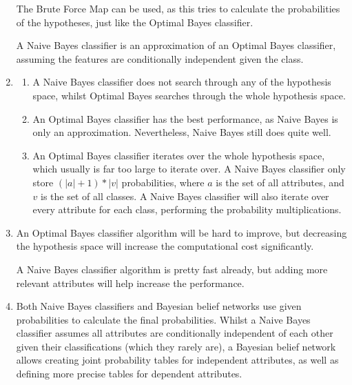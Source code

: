 \documentclass{article}
\begin{document}
\begin{enumerate}
        The Brute Force Map can be used, as this tries to calculate the probabilities of the hypotheses, just like the Optimal Bayes classifier.
        
        A Naive Bayes classifier is an approximation of an Optimal Bayes classifier, assuming the features are conditionally independent given the class.
        
    \item
        \begin{enumerate}[label=(\alph*)]
            \item A Naive Bayes classifier does not search through any of the hypothesis space, whilst Optimal Bayes searches through the whole hypothesis space.
            
            \item An Optimal Bayes classifier has the best performance, as Naive Bayes is only an approximation. Nevertheless, Naive Bayes still does quite well.
            
            \item An Optimal Bayes classifier iterates over the whole hypothesis space, which usually is far too large to iterate over. A Naive Bayes classifier only store $(|a| + 1) * |v|$ probabilities, where $a$ is the set of all attributes, and $v$ is the set of all classes. A Naive Bayes classifier will also iterate over every attribute for each class, performing the probability multiplications.
        \end{enumerate}
        
    \item
        An Optimal Bayes classifier algorithm will be hard to improve, but decreasing the hypothesis space will increase the computational cost significantly.
        
        A Naive Bayes classifier algorithm is pretty fast already, but adding more relevant attributes will help increase the performance.
        
    \item
        Both Naive Bayes classifiers and Bayesian belief networks use given probabilities to calculate the final probabilities. Whilst a Naive Bayes classifier assumes all attributes are conditionally independent of each other given their classifications (which they rarely are), a Bayesian belief network allows creating joint probability tables for independent attributes, as well as defining more precise tables for dependent attributes.
\end{enumerate}
\end{document}

